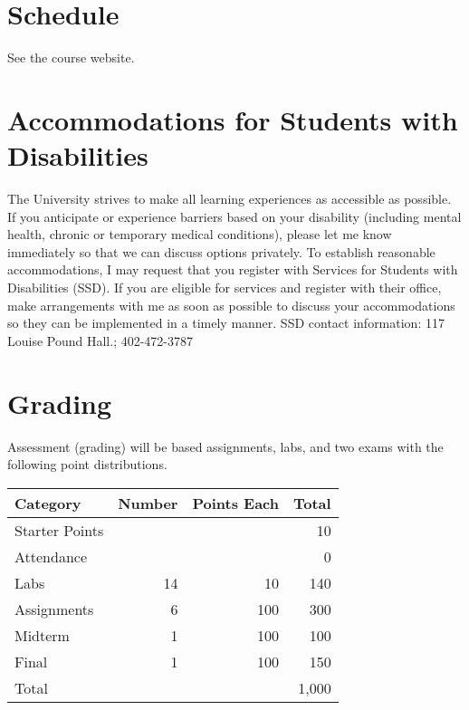 \documentclass[12pt]{scrartcl}
\begin{document}
\section{Schedule}

See the course website.

\section{Accommodations for Students with Disabilities}


The University strives to make all learning experiences as 
accessible as possible. If you anticipate or experience 
barriers based on your disability (including mental health, 
chronic or temporary medical conditions), please let me know 
immediately so that we can discuss options privately. To 
establish reasonable accommodations, I may request that you 
register with Services for Students with Disabilities (SSD). 
If you are eligible for services and register with their 
office, make arrangements with me as soon as possible to 
discuss your accommodations so they can be implemented in a 
timely manner. SSD contact information:  117 Louise Pound 
Hall.; 402-472-3787

\section{Grading}

Assessment (grading) will be based assignments, labs, 
and two exams with the following point distributions.

\begin{table}[h]
\centering
{\small
\setlength{\tabcolsep}{0.5em} %
\renewcommand{\arraystretch}{1.2}%

\begin{tabular}{lrrr}
\hline
\rowcolor{steelblue!50} Category & Number & Points Each & Total \\
\hline
\rowcolor{steelblue!5}   Starter Points    &    &     &  10 \\
\rowcolor{steelblue!10}  Attendance        &    &     &   0 \\
\rowcolor{steelblue!5}   Labs              & 14 & 10  & 140 \\
\rowcolor{steelblue!10}  Assignments       &  6 & 100 & 300 \\
\rowcolor{steelblue!5}   Midterm           & 1  & 100 & 100 \\
\rowcolor{steelblue!10}  Final             & 1  & 100 & 150 \\
\hline
Total  & & & 1,000 
\end{tabular}
}
\end{table}
\end{document}
